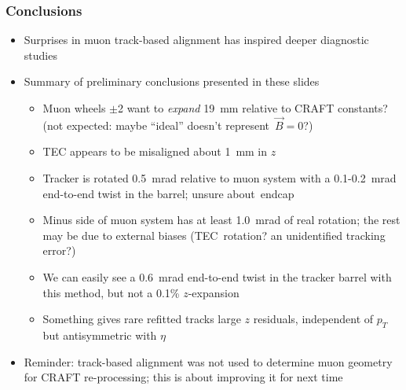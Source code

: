 \documentclass[compress]{beamer}
\begin{document}
\begin{frame}
\frametitle{Conclusions}
\begin{itemize}\setlength{\itemsep}{0.05 cm}
\item Surprises in muon track-based alignment has inspired deeper
  diagnostic studies
\item Summary of preliminary conclusions presented in these slides
\begin{itemize}\setlength{\itemsep}{0.05 cm}
\item Muon wheels $\pm$2 want to {\it expand} 19~mm relative to CRAFT constants? (not expected: maybe ``ideal'' doesn't \mbox{represent $\vec{B}=0$?)\hspace{-1 cm}}
\item TEC appears to be misaligned about 1~mm in $z$
\item Tracker is rotated 0.5~mrad relative to muon system with a
  0.1-0.2~mrad end-to-end twist in the barrel; unsure \mbox{about endcap\hspace{-1 cm}}
\item Minus side of muon system has at least 1.0~mrad of real
  rotation; the rest may be due to external biases \mbox{(TEC rotation?\hspace{-0.3 cm}} an
  unidentified tracking error?)
\item We can easily see a 0.6~mrad end-to-end twist in the tracker
  barrel with this method, but not a 0.1\% $z$-expansion
\item Something gives rare refitted tracks large $z$ residuals,
  independent of $p_T$ but antisymmetric with $\eta$
\end{itemize}
\item Reminder: track-based alignment was not used to determine muon
  geometry for CRAFT re-processing; this is about improving it for next time
\end{itemize}
\end{frame}
\end{document}
